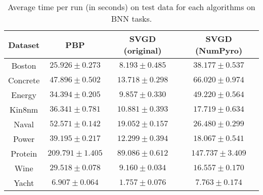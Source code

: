 \begin{table}[t]
\centering
\begin{tabular}{|c|ccc|}
\hline
 Dataset & PBP & SVGD (original) & SVGD (NumPyro)  \\
 \hline
Boston & $25.926 \pm 0.273$ & $8.193 \pm 0.485$ & $38.177 \pm 0.537$ \\
Concrete & $47.896 \pm 0.502$ & $13.718 \pm 0.298$ & $66.020 \pm 0.974$ \\
Energy & $34.394 \pm 0.205$ & $9.857 \pm 0.330$ & $49.220 \pm 0.564$ \\
Kin8nm & $36.341 \pm 0.781$ & $10.881 \pm 0.393$ & $17.719 \pm 0.634$ \\
Naval & $52.571 \pm 0.142$ & $19.052 \pm 0.157$ & $26.480 \pm 0.299$ \\
Power & $39.195 \pm 0.217$ & $12.299 \pm 0.394$ & $18.067 \pm 0.541$ \\
Protein & $209.791 \pm 1.405$ & $89.086 \pm 0.612$ & $147.737 \pm 3.409$ \\
Wine & $29.518 \pm 0.078$ & $9.160 \pm 0.034$ & $16.557 \pm 0.170$ \\
Yacht & $6.907 \pm 0.064$ & $1.757 \pm 0.076$ & $7.763 \pm 0.174$ \\
\hline
\end{tabular}
\caption{Average time per run (in seconds) on test data for each algorithms on BNN tasks.} 
\label{tab:bnn_time}
\end{table}
